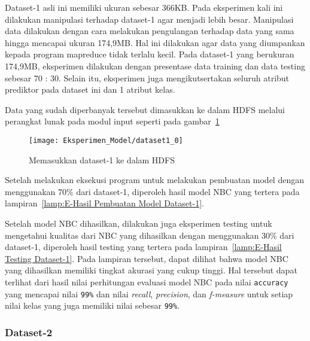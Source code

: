 Dataset-1 asli ini memiliki ukuran sebesar 366KB. Pada eksperimen kali ini dilakukan manipulasi terhadap dataset-1 agar menjadi lebih besar. Manipulasi data dilakukan dengan cara melakukan pengulangan terhadap data yang sama hingga mencapai ukuran 174,9MB. Hal ini dilakukan agar data yang diumpankan kepada program mapreduce tidak terlalu kecil. Pada dataset-1 yang berukuran 174,9MB, eksperimen dilakukan dengan presentase data training dan data testing sebesar 70 : 30. Selain itu, eksperimen juga mengikutsertakan seluruh atribut prediktor pada dataset ini dan 1 atribut kelas.

Data yang sudah diperbanyak tersebut dimasukkan ke dalam HDFS melalui perangkat lunak pada modul input seperti pada gambar~\ref{fig:Memasukkan dataset-1 ke dalam HDFS}

\begin{figure}[H]
	\centering
	\texttt{[image: Eksperimen\_Model/dataset1\_0]}
	\caption[Memasukkan dataset-1 ke dalam HDFS]{Memasukkan dataset-1 ke dalam HDFS}
	\label{fig:Memasukkan dataset-1 ke dalam HDFS}
\end{figure}

Setelah melakukan eksekusi program untuk melakukan pembuatan model dengan menggunakan 70\% dari dataset-1, diperoleh hasil model NBC yang tertera pada lampiran~\ref{lamp:E-Hasil Pembuatan Model Dataset-1}.

Setelah model NBC dihasilkan, dilakukan juga eksperimen testing untuk mengetahui kualitas dari NBC yang dihasilkan dengan menggunakan 30\% dari dataset-1, diperoleh hasil testing yang tertera pada lampiran~\ref{lamp:E-Hasil Testing Dataset-1}. Pada lampiran tersebut, dapat dilihat bahwa model NBC yang dihasilkan memiliki tingkat akurasi yang cukup tinggi. Hal tersebut dapat terlihat dari hasil nilai perhitungan evaluasi model NBC pada nilai \texttt{accuracy} yang mencapai nilai \texttt{99\%} dan nilai \textit{recall}, \textit{precision}, dan \textit{f-measure} untuk setiap nilai kelas yang juga memiliki nilai sebesar \texttt{99\%}.

\subsubsection{Dataset-2}

